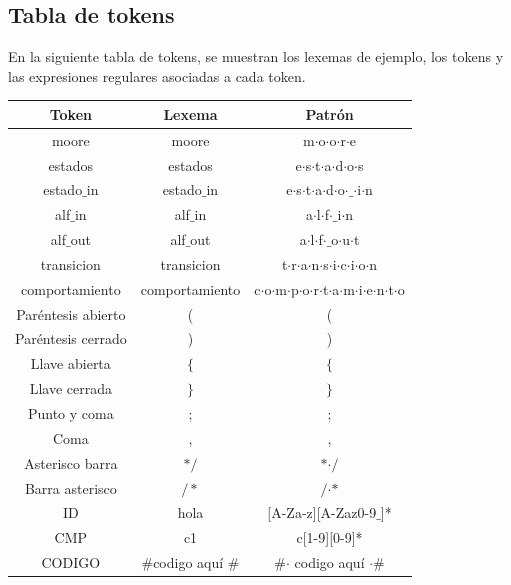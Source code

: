 \documentclass[12pt,a4paper]{article}
\begin{document}
\clearpage
\subsection{Tabla de tokens}
En la siguiente tabla de tokens, se muestran los lexemas de ejemplo, los tokens y las expresiones regulares asociadas a cada token.
\begin{center}
		\begin{tabular}{|c|c|c|}
			\hline 
			\textbf{Token} & \textbf{Lexema} & \textbf{Patrón} \\ 
			\hline 
			moore & moore & m$\cdot$o$\cdot$o$\cdot$r$\cdot$e  \\ 
			\hline 
			estados &estados & e$\cdot$s$\cdot$t$\cdot$a$\cdot$d$\cdot$o$\cdot$s \\ 
			\hline 
			estado$\_$in & estado$\_$in & e$\cdot$s$\cdot$t$\cdot$a$\cdot$d$\cdot$o$\cdot$$\_$$\cdot$i$\cdot$n \\ 
			\hline 
			alf$\_$in	& alf$\_$in & a$\cdot$l$\cdot$f$\cdot$$\_$i$\cdot$n \\ 
			\hline 
				alf$\_$out	& alf$\_$out & a$\cdot$l$\cdot$f$\cdot$$\_$o$\cdot$u$\cdot$t \\ 
			\hline 
				transicion	& transicion & t$\cdot$r$\cdot$a$\cdot$n$\cdot$s$\cdot$i$\cdot$c$\cdot$i$\cdot$o$\cdot$n \\ 
			\hline 
				comportamiento	& comportamiento & c$\cdot$o$\cdot$m$\cdot$p$\cdot$o$\cdot$r$\cdot$t$\cdot$a$\cdot$m$\cdot$i$\cdot$e$\cdot$n$\cdot$t$\cdot$o \\ 
			\hline 
			Paréntesis abierto	& ( & ( \\ 
			\hline 
			Paréntesis cerrado	& ) & ) \\ 
			\hline 
			Llave abierta	& $\{$ & $\{$ \\ 
			\hline 
			Llave cerrada	& $\}$ & $\}$ \\ 
			\hline 
			Punto y coma	& ; & ; \\ 
			\hline 
			Coma	& , &  , \\ 
			\hline
			Asterisco barra & $\ast/$  & $\ast$$\cdot/$ \\ 
			\hline 
			Barra asterisco & $/\ast$  &  $/$$\cdot$$\ast$ \\ 
			\hline  
			ID	& hola  & [A-Za-z][A-Zaz0-9$\_$]* \\ 
			\hline 
			CMP	& c1 & c[1-9][0-9]* \\ 
			\hline
		    CODIGO	& $\#$codigo aquí $\#$  & $\#$$\cdot$ codigo aquí $\cdot$$\#$\\ 
			\hline
		\end{tabular} 	
	\end{center}
\end{document}
